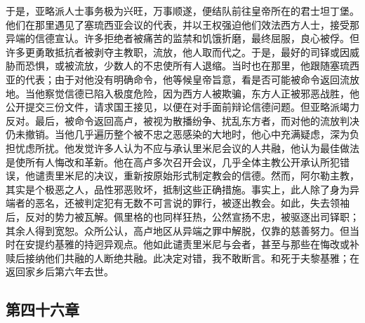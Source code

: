 于是，亚略派人士事务极为兴旺，万事顺遂，便结队前往皇帝所在的君士坦丁堡。他们在那里遇见了塞琉西亚会议的代表，并以王权强迫他们效法西方人士，接受那异端的信德宣认。许多拒绝者被痛苦的监禁和饥饿折磨，最终屈服，良心被俘。但许多更勇敢抵抗者被剥夺主教职，流放，他人取而代之。于是，最好的司铎或因威胁而恐惧，或被流放，少数人的不忠使所有人退缩。当时也在那里，他跟随塞琉西亚的代表；由于对他没有明确命令，他等候皇帝旨意，看是否可能被命令返回流放地。当他察觉信德已陷入极度危险，因为西方人被欺骗，东方人正被邪恶战胜，他公开提交三份文件，请求国王接见，以便在对手面前辩论信德问题。但亚略派竭力反对。最后，被命令返回高卢，被视为散播纷争、扰乱东方者，而对他的流放判决仍未撤销。当他几乎遍历整个被不忠之恶感染的大地时，他心中充满疑虑，深为负担忧虑所扰。他发觉许多人认为不应与承认里米尼会议的人共融，他认为最佳做法是使所有人悔改和革新。他在高卢多次召开会议，几乎全体主教公开承认所犯错误，他谴责里米尼的决议，重新按原始形式制定教会的信德。然而，阿尔勒主教，其实是个极恶之人，品性邪恶败坏，抵制这些正确措施。事实上，此人除了身为异端者的恶名，还被判定犯有无数不可言说的罪行，被逐出教会。如此，失去领袖后，反对的势力被瓦解。佩里格的也同样狂热，公然宣扬不忠，被驱逐出司铎职；其余人得到宽恕。众所公认，高卢地区从异端之罪中解脱，仅靠的慈善努力。但当时在安提约基雅的持迥异观点。他如此谴责里米尼与会者，甚至与那些在悔改或补赎后接纳他们共融的人断绝共融。此决定对错，我不敢断言。和死于夫黎基雅；在返回家乡后第六年去世。\par


\subsection{第四十六章}

